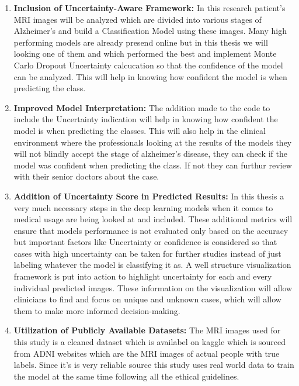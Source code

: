 \documentclass[12pt,twocolumn]{report}
\begin{document}
\begin{enumerate}
    \item \textbf{ Inclusion of Uncertainty-Aware Framework:} In this research patient's MRI images will be analyzed which are divided into various stages of Alzheimer's and build a Classification Model using these images. Many high performing models are already presend online but in this thesis we will looking one of them and which performed the best and implement Monte Carlo Dropout Uncertainty calcucation so that the confidence of the model can be analyzed. This will help in knowing how confident the model is when predicting the class.

    \item  \textbf{ Improved Model Interpretation:} The addition made to the code to include the Uncertainty indication will help in knowing how confident the model is when predicting the classes. This will also help in the clinical environment where the professionals looking at the results of the models they will not blindly accept the stage of alzheimer's disease, they can check if the model was confident when predicting the class. If not they can furthur review with their senior doctors about the case.

    \item \textbf{ Addition of Uncertainty Score in Predicted Results:}
    In this thesis a very much necessary steps in the deep learning models when it comes to medical usage are being looked at and included. These additional metrics will ensure that models performance is not evaluated only based on the accuracy but important factors like Uncertainty or confidence is considered so that cases with high uncertainty can be taken for further studies instead of just labeling whatever the model is classifying it as. A well structure visualization framework is put into action to highlight uncertainty for each and every individual predicted images. These information on the visualization will allow clinicians to find and focus on unique and unknown cases, which will allow them to make more informed decision-making.
    

    \item \textbf{Utilization of Publicly Available Datasets:} The MRI images used for this study is a cleaned dataset which is availabel on kaggle which is sourced from ADNI websites which are the MRI images of actual people with true labels. Since it's is very reliable source this study uses real world data to train the model at the same time following all the ethical guidelines.
    

\end{enumerate}
\end{document}
